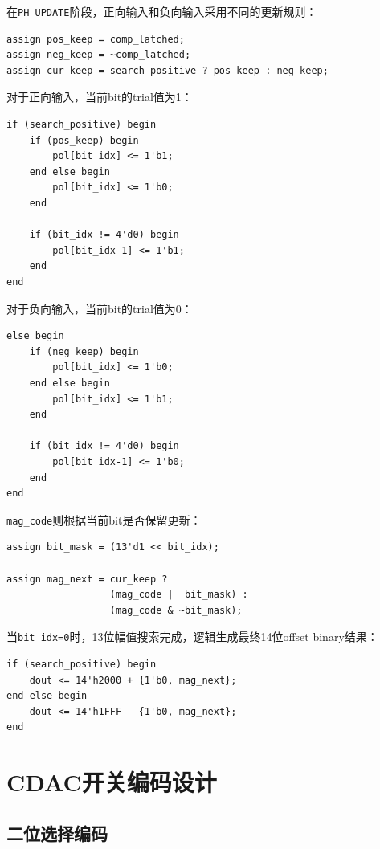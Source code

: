 在\texttt{PH\_UPDATE}阶段，正向输入和负向输入采用不同的更新规则：
\begin{lstlisting}[style=verilogstyle]
assign pos_keep = comp_latched;
assign neg_keep = ~comp_latched;
assign cur_keep = search_positive ? pos_keep : neg_keep;
\end{lstlisting}

对于正向输入，当前bit的trial值为1：
\begin{lstlisting}[style=verilogstyle]
if (search_positive) begin
    if (pos_keep) begin
        pol[bit_idx] <= 1'b1;
    end else begin
        pol[bit_idx] <= 1'b0;
    end

    if (bit_idx != 4'd0) begin
        pol[bit_idx-1] <= 1'b1;
    end
end
\end{lstlisting}

对于负向输入，当前bit的trial值为0：
\begin{lstlisting}[style=verilogstyle]
else begin
    if (neg_keep) begin
        pol[bit_idx] <= 1'b0;
    end else begin
        pol[bit_idx] <= 1'b1;
    end

    if (bit_idx != 4'd0) begin
        pol[bit_idx-1] <= 1'b0;
    end
end
\end{lstlisting}

\texttt{mag\_code}则根据当前bit是否保留更新：
\begin{lstlisting}[style=verilogstyle]
assign bit_mask = (13'd1 << bit_idx);

assign mag_next = cur_keep ?
                  (mag_code |  bit_mask) :
                  (mag_code & ~bit_mask);
\end{lstlisting}

当\texttt{bit\_idx=0}时，13位幅值搜索完成，逻辑生成最终14位offset binary结果：
\begin{lstlisting}[style=verilogstyle]
if (search_positive) begin
    dout <= 14'h2000 + {1'b0, mag_next};
end else begin
    dout <= 14'h1FFF - {1'b0, mag_next};
end
\end{lstlisting}

\section{CDAC开关编码设计}

\subsection{二位选择编码}

